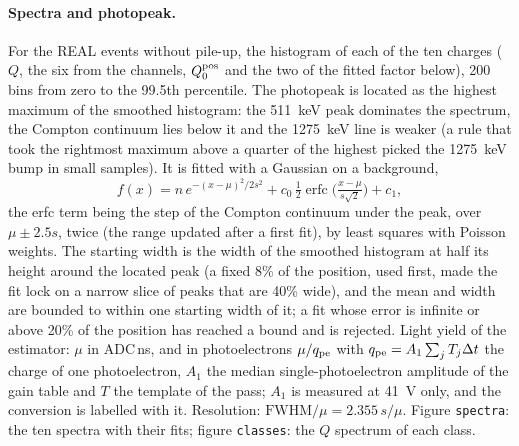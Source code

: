 \documentclass[11pt]{article}
\newcommand{\code}[1]{\texttt{#1}}
\begin{document}
\paragraph{Spectra and photopeak.} For the REAL events without pile-up,
the histogram of each of the ten charges ($Q$, the six from the
channels, $Q^{\rm pos}_0$ and the two of the fitted factor below), 200 bins from zero to the 99.5th percentile. The photopeak is
located as the highest maximum of the smoothed histogram: the 511~keV
peak dominates the spectrum, the Compton continuum lies below it and the
1275~keV line is weaker (a rule that took the rightmost maximum above a
quarter of the highest picked the 1275~keV bump in small samples). It is fitted with a Gaussian on a background,
\[
  f(x) = n\, e^{-(x - \mu)^2 / 2 s^2} + c_0\, \tfrac{1}{2}\operatorname{erfc}\!\big(\tfrac{x - \mu}{s\sqrt 2}\big) + c_1,
\]
the erfc term being the step of the Compton continuum under the peak,
over $\mu \pm 2.5 s$, twice (the range updated after a first fit), by
least squares with Poisson weights. The starting width is the width of
the smoothed histogram at half its height around the located peak (a
fixed 8\% of the position, used first, made the fit lock on a narrow
slice of peaks that are 40\% wide), and the mean and width are bounded
to within one starting width of it; a fit whose error is infinite or
above 20\% of the position has reached a bound and is rejected. Light yield of the estimator: $\mu$
in ADC\,ns, and in photoelectrons $\mu / q_{\rm pe}$ with $q_{\rm pe} = A_1
\sum_j T_j \Delta t$ the charge of one photoelectron, $A_1$ the median
single-photoelectron amplitude of the gain table and $T$ the template of
the pass; $A_1$ is measured at 41~V only, and the conversion is labelled
with it. Resolution: $\mathrm{FWHM}/\mu = 2.355\, s / \mu$. Figure
\code{spectra}: the ten spectra with their fits; figure \code{classes}:
the $Q$ spectrum of each class.
\end{document}
